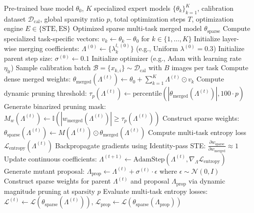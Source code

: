 \begin{algorithm}[tb]
   \caption{ZipMerge Joint Co-Optimization}
   \label{alg:zipmerge}
\begin{algorithmic}[1]
    Pre-trained base model $\theta_0$, $K$ specialized expert models $\{\theta_k\}_{k=1}^K$, calibration dataset $\mathcal{D}_{\text{cal}}$, global sparsity ratio $p$, total optimization steps $T$, optimization engine $E \in \{\text{STE}, \text{ES}\}$
    Optimized sparse multi-task merged model $\theta_{\text{sparse}}$
   \STATE Compute specialized task-specific vectors: $v_k \leftarrow \theta_k - \theta_0$ for $k \in \{1, \dots, K\}$
   \STATE Initialize layer-wise merging coefficients: $\Lambda^{(0)} \leftarrow \{\lambda^{l,(0)}_k\}$ (e.g., Uniform $\lambda^{(0)} = 0.3$)
     \STATE Initialize parent step size: $\sigma^{(0)} \leftarrow 0.1$
     \STATE Initialize optimizer (e.g., Adam with learning rate $\eta_{\text{lr}}$)
   \ENDIF
     \STATE Sample calibration batch $\mathcal{B} = \{x_{k, i}\} \sim \mathcal{D}_{\text{cal}}$ with $B$ images per task
       \STATE Compute dense merged weights: $\theta_{\text{merged}}(\Lambda^{(t)}) \leftarrow \theta_0 + \sum_{k=1}^K \Lambda^{(t)} \odot v_k$
       \STATE Compute dynamic pruning threshold: $\tau_p(\Lambda^{(t)}) \leftarrow \text{percentile}(|\theta_{\text{merged}}(\Lambda^{(t)})|, 100 \cdot p)$
       \STATE Generate binarized pruning mask: $M_w(\Lambda^{(t)}) \leftarrow \mathbb{I}(|w_{\text{merged}}(\Lambda^{(t)})| \ge \tau_p(\Lambda^{(t)}))$
       \STATE Construct sparse weights: $\theta_{\text{sparse}}(\Lambda^{(t)}) \leftarrow M(\Lambda^{(t)}) \odot \theta_{\text{merged}}(\Lambda^{(t)})$
       \STATE Compute multi-task entropy loss $\mathcal{L}_{\text{entropy}}(\Lambda^{(t)})$
       \STATE Backpropagate gradients using Identity-pass STE: $\frac{\partial w_{\text{sparse}}}{\partial w_{\text{merged}}} \approx 1$
       \STATE Update continuous coefficients: $\Lambda^{(t+1)} \leftarrow \text{AdamStep}(\Lambda^{(t)}, \nabla_{\Lambda} \mathcal{L}_{\text{entropy}})$
       \STATE Generate mutant proposal: $\Lambda_{\text{prop}} \leftarrow \Lambda^{(t)} + \sigma^{(t)} \cdot \epsilon$ where $\epsilon \sim \mathcal{N}(0, I)$
       \STATE Construct sparse weights for parent $\Lambda^{(t)}$ and proposal $\Lambda_{\text{prop}}$ via dynamic magnitude pruning at sparsity $p$
       \STATE Evaluate multi-task entropy losses: $\mathcal{L}^{(t)} \leftarrow \mathcal{L}(\theta_{\text{sparse}}(\Lambda^{(t)}))$, $\mathcal{L}_{\text{prop}} \leftarrow \mathcal{L}(\theta_{\text{sparse}}(\Lambda_{\text{prop}}))$

\end{algorithmic}
\end{algorithm}
